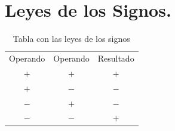 \documentclass[oneside]{book}
\theoremstyle{definition}
\begin{document}
\section{Leyes de los Signos.}
\begin{table}[h]
  \centering
  \begin{tabular}{| c | c  | c |}
    \hline
    Operando & Operando & Resultado\\
    $+$  &  $+$  & $+$\\
    \hline
    $+$  &  $-$  & $-$\\
    \hline
    $-$  &  $+$  & $-$\\
    \hline
    $-$  &  $-$  & $+$\\
    \hline
  \end{tabular}
  \caption{Tabla con las leyes de los signos}
  \label{tab:leyes_signos}
\end{table}





































\end{document}
